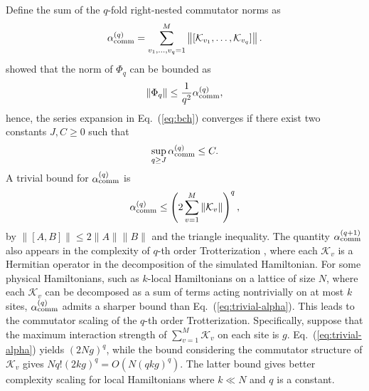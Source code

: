 \documentclass[11pt]{article}
\newcommand{\eq}[1]{(\ref{eq:#1})}
\newcommand{\mc}{\mathcal}
\begin{document}
Define the sum of the $q$-fold right-nested commutator norms as
\begin{align}
\label{eq:def-comm}
 	\alpha_{\rm comm}^{(q)} =\sum_{v_1, \ldots, v_q = 1}^{M} \left\|[\mc K_{v_1}, \ldots, \mc K_{v_q}]\right\|.
\end{align}
\citet{aftab2024multi} showed that the norm of $\Phi_q$ can be bounded as
\begin{align*}
 	\|\Phi_q\|\le \frac{1}{q^2} 	\alpha_{\rm comm}^{(q)},
\end{align*}
hence, the series expansion in Eq.~\eq{bch} converges if there exist two constants $J,C\ge 0$ such that
\begin{align}
\label{eq:converg-bch}
 	\sup_{q\ge J}\alpha_{\rm comm}^{(q)} \le C.
\end{align} 
A trivial bound for $\alpha_{\rm comm}^{(q)}$ is
\begin{align}
\label{eq:trivial-alpha}
 	\alpha_{\rm comm}^{(q)} \le \left(2\sum_{v = 1}^M \|\mc K_v\|\right)^q,
\end{align}
by $\|[A,B]\|\le 2\|A\|\|B\|$ and the triangle inequality. The quantity $\alpha_{\rm comm}^{(q+1)}$ also appears in the complexity of $q$-th order Trotterization \cite{childs2021theory}, where each $\mc K_v$ is a Hermitian operator in the decomposition of the simulated Hamiltonian. For some physical Hamiltonians, such as $k$-local Hamiltonians on a lattice of size $N$, where each $\mc K_v$ can be decomposed as a sum of terms acting nontrivially on at most $k$ sites, $\alpha_{\rm comm}^{(q)}$ admits a sharper bound than Eq.~\eq{trivial-alpha}. This leads to the commutator scaling of the $q$-th order Trotterization. Specifically, suppose that the maximum interaction strength of $\sum_{v = 1}^M \mc K_v$ on each site is $g$. Eq.~\eq{trivial-alpha} yields $(2Ng)^q$, while the bound considering the commutator structure of $\mc K_v$ gives $Nq!(2kg)^q = O(N(qkg)^q)$. The latter bound gives better complexity scaling for local Hamiltonians where $k\ll N$ and $q$ is a constant. 
\end{document}
